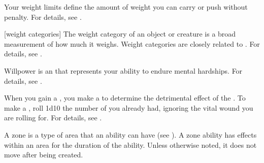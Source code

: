  Your weight limits define the amount of weight you can carry or push without penalty.
For details, see .

[weight categories] The weight category of an object or creature is a broad measurement of how much it weighs.
Weight categories are closely related to .
For details, see .

 Willpower is an  that represents your ability to endure mental hardships.
For details, see .

 When you gain a , you make a  to determine the detrimental effect of the .
To make a , roll 1d10 \sub the number of  you already had, ignoring the vital wound you are rolling for.
For details, see .

 A zone is a type of area that an ability can have (see ).
A zone ability has effects within an area for the duration of the ability.
Unless otherwise noted, it does not move after being created.
